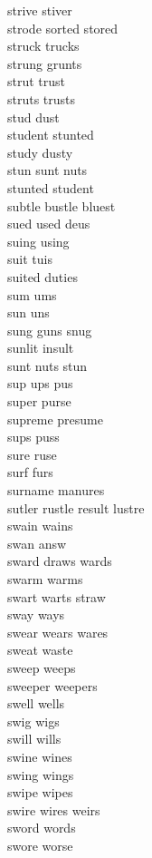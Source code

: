 strive stiver\\
strode sorted stored\\
struck trucks\\
strung grunts\\
strut trust\\
struts trusts\\
stud dust\\
student stunted\\
study dusty\\
stun sunt nuts\\
stunted student\\
subtle bustle bluest\\
sued used deus\\
suing using\\
suit tuis\\
suited duties\\
sum ums\\
sun uns\\
sung guns snug\\
sunlit insult\\
sunt nuts stun\\
sup ups pus\\
super purse\\
supreme presume\\
sups puss\\
sure ruse\\
surf furs\\
surname manures\\
sutler rustle result lustre\\
swain wains\\
swan answ\\
sward draws wards\\
swarm warms\\
swart warts straw\\
sway ways\\
swear wears wares\\
sweat waste\\
sweep weeps\\
sweeper weepers\\
swell wells\\
swig wigs\\
swill wills\\
swine wines\\
swing wings\\
swipe wipes\\
swire wires weirs\\
sword words\\
swore worse\\

